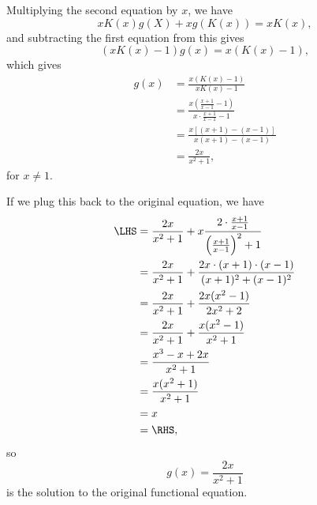 \begin{enumerate}
          Multiplying the second equation by \(x\), we have
          \[
              xK(x) g(X) + x g(K(x)) = x K(x),
          \]
          and subtracting the first equation from this gives
          \[
              (x K(x) - 1) g(x) = x (K(x) - 1),
          \]
          which gives
          \begin{align*}
              g(x) & = \frac{x \left(K(x) - 1\right)}{x K(x) - 1}                                     \\
                   & = \frac{x \left(\frac{x + 1}{x - 1} - 1\right)}{x \cdot \frac{x + 1}{x - 1} - 1} \\
                   & = \frac{x \left[(x + 1) - (x - 1)\right]}{x (x + 1) - (x - 1)}                   \\
                   & = \frac{2x}{x^2 + 1},
          \end{align*}
          for \(x \neq 1\).

          If we plug this back to the original equation, we have
          \begin{align*}
              \LHS & = \frac{2x}{x^2 + 1} + x \frac{2 \cdot \frac{x + 1}{x - 1}}{\left(\frac{x + 1}{x - 1}\right)^2 + 1} \\
                   & = \frac{2x}{x^2 + 1} + \frac{2x \cdot (x + 1) \cdot (x - 1)}{(x + 1)^2 + (x - 1)^2}                 \\
                   & = \frac{2x}{x^2 + 1} + \frac{2x(x^2 - 1)}{2x^2 + 2}                                                 \\
                   & = \frac{2x}{x^2 + 1} + \frac{x(x^2 - 1)}{x^2 + 1}                                                   \\
                   & = \frac{x^3 - x + 2x}{x^2 + 1}                                                                      \\
                   & = \frac{x(x^2 + 1)}{x^2 + 1}                                                                        \\
                   & = x                                                                                                 \\
                   & = \RHS,
          \end{align*}
          so \[g(x) = \frac{2x}{x^2 + 1}\] is the solution to the original functional equation.


\end{enumerate}
